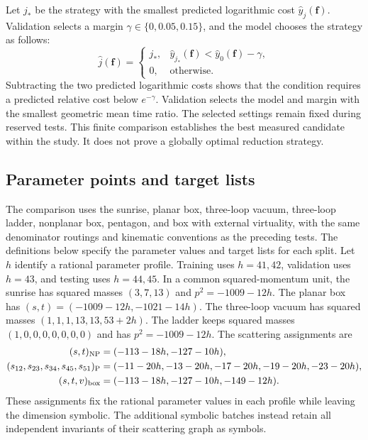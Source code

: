 Let $j_*$ be the strategy with the smallest predicted logarithmic cost
$\widehat y_j(\boldsymbol f)$. Validation selects a margin
$\gamma\in\{0,0.05,0.15\}$, and the model chooses the strategy as follows:
\begin{equation}
 \widehat j(\boldsymbol f)=
 \begin{cases}
 j_*,&\widehat y_{j_*}(\boldsymbol f)<\widehat y_0(\boldsymbol f)-\gamma,\\
 0,&\text{otherwise}.
 \end{cases}
 \label{eq:workflow-choice}
\end{equation}
Subtracting the two predicted logarithmic costs shows that the condition
requires a predicted relative cost below $e^{-\gamma}$. Validation selects
the model and margin with the smallest geometric mean time ratio.
The selected settings remain fixed during reserved tests.
This finite comparison establishes the best measured candidate within
the study. It does not prove a globally optimal reduction strategy.

\subsection{Parameter points and target lists}
The comparison uses the sunrise, planar box, three-loop vacuum, three-loop ladder, nonplanar box, pentagon, and box with external virtuality, with the same denominator routings and kinematic conventions as the preceding tests. The definitions below specify the parameter values and target lists for each split. Let $h$ identify a rational
parameter profile. Training uses $h=41,42$, validation uses $h=43$, and
testing uses $h=44,45$. In a common squared-momentum unit, the sunrise has
squared masses $(3,7,13)$ and $p^2=-1009-12h$. The planar box has
$(s,t)=(-1009-12h,-1021-14h)$. The three-loop vacuum has squared masses
$(1,1,1,13,13,53+2h)$. The ladder keeps squared masses
$(1,0,0,0,0,0,0,0)$ and has $p^2=-1009-12h$.
The scattering assignments are
\begin{align}
 (s,t)_{\rm NP}&=(-113-18h,-127-10h),\\
 (s_{12},s_{23},s_{34},s_{45},s_{51})_{\rm P}
 &=(-11-20h,-13-20h,-17-20h,-19-20h,-23-20h),\\
 (s,t,v)_{\rm box}&=(-113-18h,-127-10h,-149-12h).
\end{align}
These assignments fix the rational parameter values in each profile while leaving the dimension symbolic. The additional symbolic batches instead retain all independent invariants of their scattering graph as symbols.

